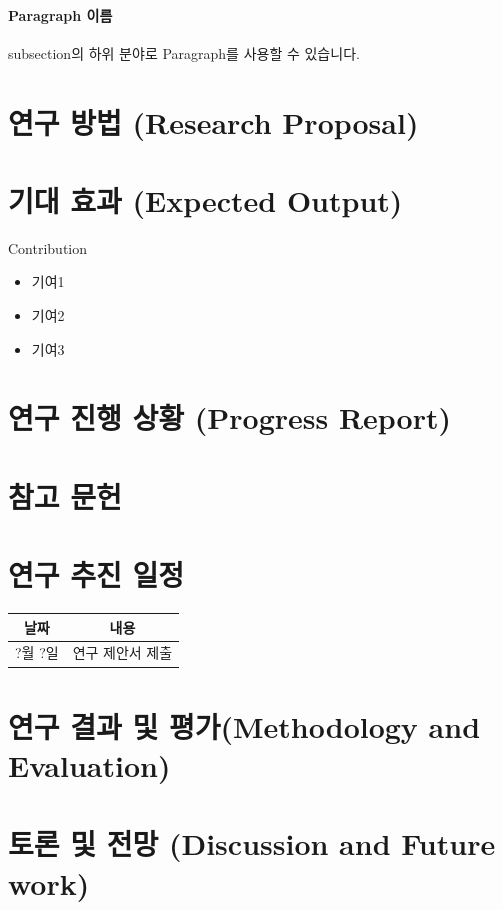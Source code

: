 \documentclass[a4paper,11pt]{article}
\theoremstyle{definition}
\begin{document}
\paragraph{Paragraph 이름}
subsection의 하위 분야로 Paragraph를 사용할 수 있습니다.

\section{연구 방법 (Research Proposal)} %

\section{기대 효과 (Expected Output)} %

Contribution
\begin{itemize}
    \item 기여1
    \item 기여2
    \item 기여3
\end{itemize}

\section{연구 진행 상황 (Progress Report)}

\section{참고 문헌}
\printbibliography[heading=none]

\section{연구 추진 일정}
\begin{center}
\begin{tabular}{ |c|c| } 
 \hline
 날짜 & 내용 \\
 \hline
?월 ?일 & 연구 제안서 제출 \\
 \hline
\end{tabular}
\end{center}

\section{연구 결과 및 평가(Methodology and Evaluation)}

\section{토론 및 전망 (Discussion and Future work)}
\end{document}

